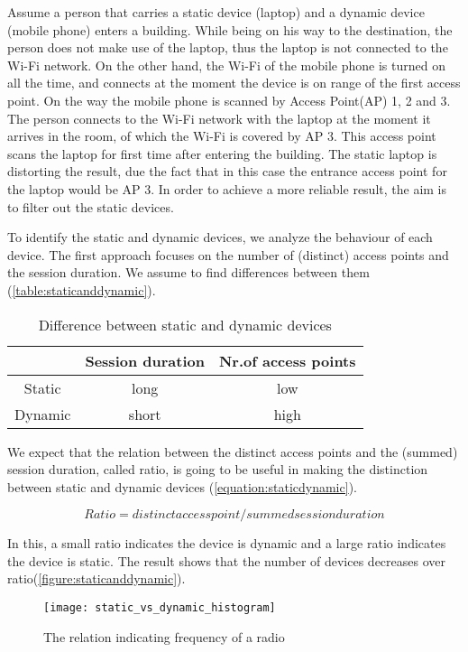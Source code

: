 Assume a person that carries a static device (laptop) and a dynamic device (mobile phone) enters a building. While being on his way to the destination, the person does not make use of the laptop, thus the laptop is not connected to the Wi-Fi network. On the other hand, the Wi-Fi of the mobile phone is turned on all the time, and connects at the moment the device is on range of the first access point. On the way the mobile phone is scanned by Access Point(AP) 1, 2 and 3. The person connects to the Wi-Fi network with the laptop at the moment it arrives in the room, of which the Wi-Fi is covered by AP 3. This access point scans the laptop for first time after entering the building. The static laptop is distorting the result, due the fact that in this case the entrance access point for the laptop would be AP 3. In order to achieve a more reliable result, the aim is to filter out the static devices.

To identify the static and dynamic devices, we analyze the behaviour of each device. The first approach focuses on the number of (distinct) access points and the session duration. We assume to find differences between them (\autoref{table:staticanddynamic}). 

\begin{table}[H]
\centering
\begin{tabular}{|c|c|c|}
\hline 
 & Session duration & Nr.of access points \\
\hline
Static & long & low \\
\hline
Dynamic & short & high \\
\hline	
\end{tabular}
\captionsetup{justification=centering}
\caption{Difference between static and dynamic devices}
\label{table:staticanddynamic}
\end{table}

We expect that the relation between the distinct access points and the (summed) session duration, called ratio, is going to be useful in making the distinction between static and dynamic devices (\autoref{equation:staticdynamic}).

\begin{equation}\label{equation:staticdynamic}
Ratio = distinct access point / summed session duration
\end{equation}

In this, a small ratio indicates the device is dynamic and a large ratio indicates the device is static. The result shows that the number of devices decreases over ratio(\autoref{figure:staticanddynamic}).
\begin{figure}[H]
\centering
\texttt{[image: static\_vs\_dynamic\_histogram]}
\captionsetup{justification=centering}
\caption{The relation indicating frequency of a radio}
\label{figure:staticanddynamic}
\end{figure}

